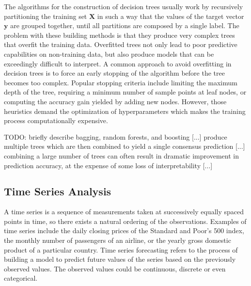The algorithms for the construction of decision trees usually work by recursively partitioning the training set $\mathbf{X}$ in such a way that the values of the target vector $\textbf{y}$ are grouped together, until all partitions are composed by a single label. The problem with these building methods is that they produce very complex trees that overfit the training data. Overfitted trees not only lead to poor predictive capabilities on non-training data, but also produce models that can be exceedingly difficult to interpret. A common approach to avoid overfitting in decision trees is to force an early stopping of the algorithm before the tree becomes too complex. Popular stopping criteria include limiting the maximum depth of the tree, requiring a minimum number of sample points at leaf nodes, or computing the accuracy gain yielded by adding new nodes. However, those heuristics demand the optimization of hyperparameters which makes the training process computationally expensive.

    {\color{red} TODO: briefly describe bagging, random forests, and boosting [...] produce multiple trees which are then combined to yield a single consensus prediction [...] combining a large number of trees can often result in dramatic improvement in prediction accuracy, at the expense of some loss of interpretability [...]}


\subsection{Time Series Analysis}
\label{sec:intro_time_series}

A time series is a sequence of measurements taken at successively equally spaced points in time, so there exists a natural ordering of the observations. Examples of time series include the daily closing prices of the Standard and Poor's 500 index, the monthly number of passengers of an airline, or the yearly gross domestic product of a particular country. Time series forecasting refers to the process of building a model to predict future values of the series based on the previously observed values. The observed values could be continuous, discrete or even categorical.

